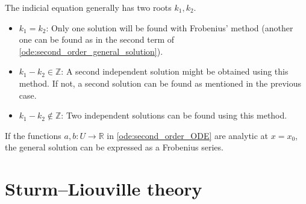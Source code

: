     \begin{property}
        The indicial equation generally has two roots $k_1,k_2$.
        \begin{itemize}
            \item $k_1=k_2$: Only one solution will be found with Frobenius' method (another one can be found as in the second term of \cref{ode:second_order_general_solution}).
            \item $k_1-k_2 \in\mathbb{Z}$: A second independent solution might be obtained using this method. If not, a second solution can be found as mentioned in the previous case.
            \item $k_1-k_2\not\in\mathbb{Z}$: Two independent solutions can be found using this method.
        \end{itemize}
    \end{property}

    \begin{theorem}[Fuchs]
        If the functions $a,b:U\rightarrow\mathbb{R}$ in \cref{ode:second_order_ODE} are analytic at $x=x_0$, the general solution can be expressed as a Frobenius series.
    \end{theorem}

\section{Sturm--Liouville theory}


